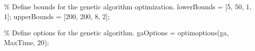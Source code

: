 \documentclass[
  super,
  review,
  3p]{elsarticle}
\newenvironment{Shaded}{\begin{snugshade}}{\end{snugshade}}
\newcommand{\CommentTok}[1]{\textcolor[rgb]{0.37,0.37,0.37}{#1}}
\newcommand{\FloatTok}[1]{\textcolor[rgb]{0.68,0.00,0.00}{#1}}
\newcommand{\NormalTok}[1]{\textcolor[rgb]{0.00,0.23,0.31}{#1}}
\newcommand{\OperatorTok}[1]{\textcolor[rgb]{0.37,0.37,0.37}{#1}}
\newcommand{\SpecialStringTok}[1]{\textcolor[rgb]{0.13,0.47,0.30}{#1}}
\newcommand{\VariableTok}[1]{\textcolor[rgb]{0.07,0.07,0.07}{#1}}
\begin{document}
\begin{Shaded}
\begin{Highlighting}[]
    \CommentTok{\% Define bounds for the genetic algorithm optimization.}
    \VariableTok{lowerBounds} \OperatorTok{=}\NormalTok{ [}\FloatTok{5}\OperatorTok{,} \FloatTok{50}\OperatorTok{,} \FloatTok{1}\OperatorTok{,} \FloatTok{1}\NormalTok{]}\OperatorTok{;}
    \VariableTok{upperBounds} \OperatorTok{=}\NormalTok{ [}\FloatTok{200}\OperatorTok{,} \FloatTok{200}\OperatorTok{,} \FloatTok{8}\OperatorTok{,} \FloatTok{2}\NormalTok{]}\OperatorTok{;}

    \CommentTok{\% Define options for the genetic algorithm.}
    \VariableTok{gaOptions} \OperatorTok{=} \VariableTok{optimoptions}\NormalTok{(}\SpecialStringTok{\textquotesingle{}ga\textquotesingle{}}\OperatorTok{,} \SpecialStringTok{\textquotesingle{}MaxTime\textquotesingle{}}\OperatorTok{,} \FloatTok{20}\NormalTok{)}\OperatorTok{;}
\end{Highlighting}
\end{Shaded}
\end{document}
